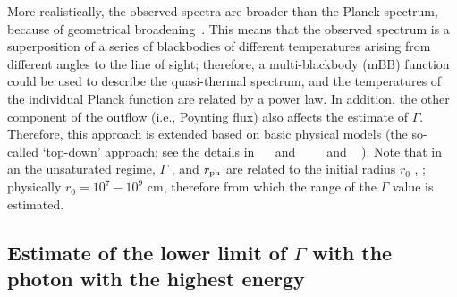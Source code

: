 \documentclass[prd,twocolumn,amsmath,amssymb,aps,linenumbers]{revtex4-2} %
\providecommand{\DIFaddtex}[1]{{\protect\color{blue} \sf #1}} %
\providecommand{\DIFdeltex}[1]{{\protect\color{red} \scriptsize #1}} %
\providecommand{\DIFaddbegin}{} %
\providecommand{\DIFaddend}{} %
\providecommand{\DIFdelbegin}{} %
\providecommand{\DIFdelend}{} %
\providecommand{\DIFadd}[1]{\texorpdfstring{\DIFaddtex{#1}}{#1}} %
\providecommand{\DIFdel}[1]{\texorpdfstring{\DIFdeltex{#1}}{}} %
\newcommand{\DIFscaledelfig}{0.5}
\newlength{\DIFdelgraphicswidth} %
\newlength{\DIFdelgraphicsheight} %
\newcommand{\DIFaddincludegraphics}[2][]{{\color{blue}\fbox{\DIFOincludegraphics[#1]{#2}}}} %
\newcommand{\DIFdelincludegraphics}[2][]{%
\sbox{\DIFdelgraphicsbox}{\DIFOincludegraphics[#1]{#2}}%
\settoboxwidth{\DIFdelgraphicswidth}{\DIFdelgraphicsbox} %
\settoboxtotalheight{\DIFdelgraphicsheight}{\DIFdelgraphicsbox} %
\scalebox{\DIFscaledelfig}{%
\parbox[b]{\DIFdelgraphicswidth}{\usebox{\DIFdelgraphicsbox}\\[-\baselineskip] \rule{\DIFdelgraphicswidth}{0em}}\llap{\resizebox{\DIFdelgraphicswidth}{\DIFdelgraphicsheight}{%
\setlength{\unitlength}{\DIFdelgraphicswidth}%
\begin{picture}(1,1)%
\thicklines\linethickness{2pt} %
{\color[rgb]{1,0,0}\put(0,0){\framebox(1,1){}}}%
{\color[rgb]{1,0,0}\put(0,0){\line( 1,1){1}}}%
{\color[rgb]{1,0,0}\put(0,1){\line(1,-1){1}}}%
\end{picture}%
}\hspace*{3pt}}} %
} %
\DeclareRobustCommand{\DIFaddbegin}{\DIFOaddbegin \let\includegraphics\DIFaddincludegraphics} %
\DeclareRobustCommand{\DIFaddend}{\DIFOaddend \let\includegraphics\DIFOincludegraphics} %
\DeclareRobustCommand{\DIFdelbegin}{\DIFOdelbegin \let\includegraphics\DIFdelincludegraphics} %
\DeclareRobustCommand{\DIFdelend}{\DIFOaddend \let\includegraphics\DIFOincludegraphics} %
\begin{document}
More realistically, the observed spectra are broader than the Planck spectrum, because of geometrical broadening~\citep[e.g.][]{2008ApJ...682..463P}. This means that the observed spectrum is a superposition of a series of blackbodies of different temperatures arising from different angles to the line of sight; therefore, a multi-blackbody (mBB) function could be used to describe the quasi-thermal spectrum, and the
temperatures of the individual Planck function are related
by a power law. In addition, the other component of the outflow (i.e., Poynting flux) also affects the estimate of $\Gamma$. Therefore, this approach is extended based on basic physical models (the so-called `top-down' approach; see the details in \DIFdelbegin \DIFdel{\mbox{%
\citep{2015ApJ...801..103G} }\hskip0pt%
and \mbox{%
\citep{2024ApJ...961..137S}}\hskip0pt%
}\DIFdelend \DIFaddbegin \DIFadd{\mbox{%
\citealt{2015ApJ...801..103G} }\hskip0pt%
and \mbox{%
\citealt{2024ApJ...961..137S}}\hskip0pt%
}\DIFaddend ). %
Note that in \DIFdelbegin \DIFdel{an }\DIFdelend \DIFaddbegin \DIFadd{the }\DIFaddend unsaturated regime, $\Gamma$ \DIFdelbegin \DIFdel{, }\DIFdelend \DIFaddbegin \DIFadd{and }\DIFaddend $r_{\rm ph}$ are related to the initial radius $r_0$\DIFdelbegin \DIFdel{, }\DIFdelend \DIFaddbegin \DIFadd{; }\DIFaddend physically $r_0=10^7 - 10^9$ cm, \DIFdelbegin \DIFdel{therefore }\DIFdelend \DIFaddbegin \DIFadd{from which }\DIFaddend the range of \DIFaddbegin \DIFadd{the }\DIFaddend $\Gamma$ value is estimated.
\DIFdelbegin %
\DIFdelend \subsection{Estimate of \DIFaddbegin \DIFadd{the }\DIFaddend lower limit of $\Gamma$ with the photon with the highest energy}
\DIFdelbegin %
\end{document}
